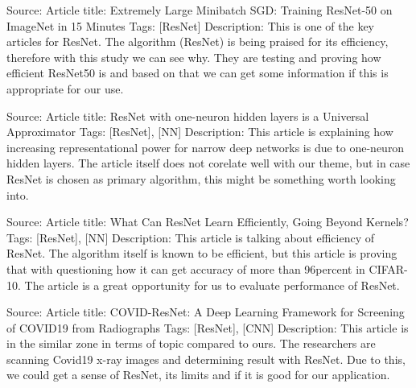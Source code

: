 Source: \parencite{akiba2017extremely}
\newline
Article title: Extremely Large Minibatch SGD: Training ResNet-50 on ImageNet in 15 Minutes 
\newline
Tags: [ResNet]
\newline
Description:
\newline
This is one of the key articles for ResNet. The algorithm (ResNet) is being praised for its efficiency, therefore with this study we can see why. They are testing and proving how efficient ResNet50 is and based on that we can get some information if this is appropriate for our use.
\newline

Source: \parencite{lin2018resnet}
\newline
Article title: ResNet with one-neuron hidden layers is a Universal Approximator 
\newline
Tags: [ResNet], [NN]
\newline
Description:
\newline
This article is explaining how increasing representational power for narrow deep networks is due to one-neuron hidden layers. The article itself does not corelate well with our theme, but in case ResNet is chosen as primary algorithm, this might be something worth looking into.
\newline

Source: \parencite{allen2019can}
\newline
Article title: What Can ResNet Learn Efficiently, Going Beyond Kernels?
\newline
Tags: [ResNet], [NN]
\newline
Description:
\newline
This article is talking about efficiency of ResNet. The algorithm itself is known to be efficient, but this article is proving that with questioning how it can get accuracy of more than 96percent in CIFAR-10. The article is a great opportunity for us to evaluate performance of ResNet.
\newline

Source: \parencite{farooq2020covid}
\newline
Article title: COVID-ResNet: A Deep Learning Framework for Screening of COVID19 from Radiographs
\newline
Tags: [ResNet], [CNN]
\newline
Description:
\newline
This article is in the similar zone in terms of topic compared to ours. The researchers are scanning Covid19 x-ray images and determining result with ResNet. Due to this, we could get a sense of ResNet, its limits and if it is good for our application.
\newline
